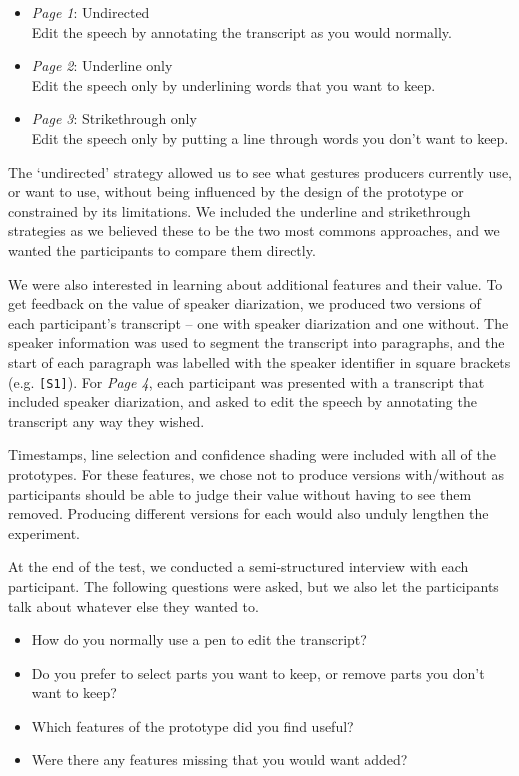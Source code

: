 \begin{itemize}
  \item \textit{Page 1}: Undirected\\Edit the speech by annotating the transcript as you would normally.
  \item \textit{Page 2}: Underline only\\Edit the speech only by underlining words that you want to keep.
  \item \textit{Page 3}: Strikethrough only\\Edit the speech only by putting a line through words you don't want to keep.
\end{itemize}

The `undirected' strategy allowed us to see what gestures producers currently use, or want to use, without being
influenced by the design of the prototype or constrained by its limitations. We included the underline and
strikethrough strategies as we believed these to be the two most commons approaches, and we wanted the participants to
compare them directly.

We were also interested in learning about additional features and their value. To get feedback on the value of speaker
diarization, we produced two versions of each participant's transcript -- one with speaker diarization and one without.
The speaker information was used to segment the transcript into paragraphs, and the start of each paragraph was
labelled with the speaker identifier in square brackets (e.g.  \texttt{{[}S1{]}}).  For \textit{Page 4}, each
participant was presented with a transcript that included speaker diarization, and asked to edit the speech by
annotating the transcript any way they wished.

Timestamps, line selection and confidence shading were included with all of the prototypes. For these features, we
chose not to produce versions with/without as participants should be able to judge their value without having to see
them removed. Producing different versions for each would also unduly lengthen the experiment.

At the end of the test, we conducted a semi-structured interview with each participant. The following questions were
asked, but we also let the participants talk about whatever else they wanted to.

{\singlespacing
\begin{itemize}
  \item How do you normally use a pen to edit the transcript?
  \item Do you prefer to select parts you want to keep, or remove parts you don't want to keep?
  \item Which features of the prototype did you find useful?
  \item Were there any features missing that you would want added?
\end{itemize}
}

